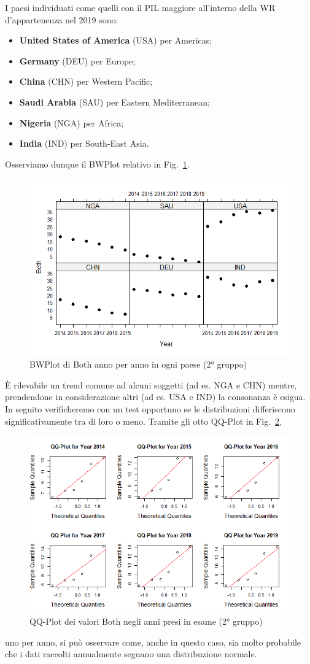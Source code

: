 \documentclass[conference]{IEEEtran}
\begin{document}
I paesi individuati come quelli con il PIL maggiore \cite{b6} all'interno della WR
d'appartenenza nel 2019 sono:
\begin{itemize}
    \item \textbf{United States of America} (USA) per Americas;
    \item \textbf{Germany} (DEU) per Europe;
    \item \textbf{China} (CHN) per Western Pacific;
    \item \textbf{Saudi Arabia} (SAU) per Eastern Mediterranean;
    \item \textbf{Nigeria} (NGA) per Africa;
    \item \textbf{India} (IND) per South-East Asia. 
\end{itemize}
Osserviamo dunque il BWPlot relativo in Fig.~\ref{7secondgroup}.
\begin{figure}[htbp]
    \centerline{\includegraphics[width=.5\textwidth]{img/7 - Secondgroup.png}}
    \caption{BWPlot di Both anno per anno in ogni paese (2° gruppo)}
    \label{7secondgroup}
\end{figure}
\`E rilevabile un trend comune ad alcuni soggetti (ad es. NGA e CHN) mentre, prendendone
in considerazione altri (ad es. USA e IND) la consonanza è esigua.
In seguito verificheremo con un test opportuno se le distribuzioni differiscono significativamente
tra di loro o meno.
Tramite gli otto QQ-Plot in Fig.~\ref{8secondqq},
\begin{figure}[htbp]
    \centerline{\includegraphics[width=.5\textwidth]{img/8 - Secondqq.png}}
    \caption{QQ-Plot dei valori Both negli anni presi in esame (2° gruppo)}
    \label{8secondqq}
\end{figure}
uno per anno, si può osservare come, anche in questo caso,
sia molto probabile che i dati raccolti annualmente seguano una distribuzione normale.
\end{document}
